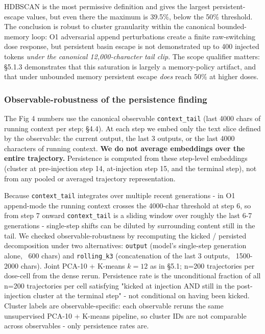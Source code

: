 \documentclass{article}
\theoremstyle{plain}
\theoremstyle{definition}
\begin{document}
HDBSCAN is the most permissive definition and gives the largest persistent-escape values, but even there the maximum is 39.5\%, below the 50\% threshold. The conclusion is robust to cluster granularity within the canonical bounded-memory loop: O1 adversarial append perturbations create a finite raw-switching dose response, but persistent basin escape is not demonstrated up to 400 injected tokens \textit{under the canonical 12,000-character tail clip}. The scope qualifier matters: §5.1.3 demonstrates that this saturation is largely a memory-policy artifact, and that under unbounded memory persistent escape \textit{does} reach 50\% at higher doses.

\subsubsection{Observable-robustness of the persistence finding}

The Fig 4 numbers use the canonical observable \texttt{context\_tail} (last 4000 chars of running context per step; §4.4). At each step we embed only the text slice defined by the observable: the current output, the last 3 outputs, or the last 4000 characters of running context. \textbf{We do not average embeddings over the entire trajectory.} Persistence is computed from these step-level embeddings (cluster at pre-injection step 14, at-injection step 15, and the terminal step), not from any pooled or averaged trajectory representation.

Because \texttt{context\_tail} integrates over multiple recent generations - in O1 append-mode the running context crosses the 4000-char threshold at step 6, so from step 7 onward \texttt{context\_tail} is a sliding window over roughly the last 6-7 generations - single-step shifts can be diluted by surrounding content still in the tail. We checked observable-robustness by recomputing the kicked / persisted decomposition under two alternatives: \texttt{output} (model's single-step generation alone, ~600 chars) and \texttt{rolling\_k3} (concatenation of the last 3 outputs, ~1500-2000 chars). Joint PCA-10 + K-means $k=12$ as in §5.1; n=200 trajectories per dose-cell from the dense rerun. Persistence rate is the unconditional fraction of all n=200 trajectories per cell satisfying "kicked at injection AND still in the post-injection cluster at the terminal step" - not conditional on having been kicked. Cluster labels are observable-specific: each observable reruns the same unsupervised PCA-10 + K-means pipeline, so cluster IDs are not comparable across observables - only persistence rates are.
\end{document}

